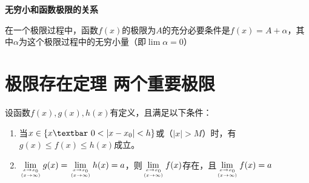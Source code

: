 \textbf{无穷小和函数极限的关系}

在一个极限过程中，函数$f(x)$的极限为$A$的充分必要条件是$f(x)=A+\alpha$，其中$\alpha$为这个极限过程中的无穷小量（即$\lim \alpha = 0$）

\section{极限存在定理 \quad 两个重要极限}
\begin{theorem}[夹逼定理] \label{thm:squeeze_theorem_function}
    设函数$f(x),g(x),h(x)$有定义，且满足以下条件：
    \begin{enumerate}
        \item 当$x\in \{ x \textbar \ 0 < \left|x-x_0\right| < h \}$或（$\left|x\right|>M$）时，有$g(x)\leq f(x) \leq h(x)$成立。
        \item $\displaystyle \lim_{x\rightarrow x_0 \atop (x\rightarrow\infty)} g(x) = \lim_{x\rightarrow x_0 \atop (x\rightarrow\infty)} h(x) = a$，则$\displaystyle\lim_{x\rightarrow x_0 \atop (x\rightarrow\infty)} f(x)$存在，且$\displaystyle\lim_{x\rightarrow x_0 \atop (x\rightarrow\infty)} f(x) = a$
    \end{enumerate}
\end{theorem}

